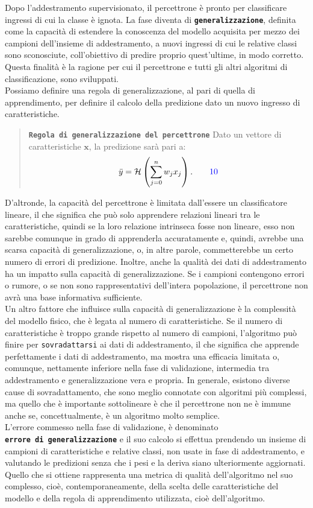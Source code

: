 \documentclass[
  letterpaper,
  DIV=11,
  numbers=noendperiod]{scrreprt}
\begin{document}
Dopo l'addestramento supervisionato, il percettrone è pronto per
classificare ingressi di cui la classe è ignota. La fase diventa di
\textbf{\texttt{generalizzazione}}, definita come la capacità di
estendere la conoscenza del modello acquisita per mezzo dei campioni
dell'insieme di addestramento, a nuovi ingressi di cui le relative
classi sono sconosciute, coll'obiettivo di predire proprio quest'ultime,
in modo corretto. Questa finalità è la ragione per cui il percettrone e
tutti gli altri algoritmi di classificazione, sono sviluppati.\\
Possiamo definire una regola di generalizzazione, al pari di quella di
apprendimento, per definire il calcolo della predizione dato un nuovo
ingresso di caratteristiche.

\begin{quote}
\textbf{\texttt{Regola\ di\ generalizzazione\ del\ percettrone}} Dato un
vettore di caratteristiche \(\mathbf{x}\), la predizione sarà pari a: \[
\bar{y}=\mathcal{H}\left(\sum_{j=0}^{n}w_j x_j\right).\tag*{\color{blue}{10}}
\]
\end{quote}

D'altronde, la capacità del percettrone è limitata dall'essere un
classificatore lineare, il che significa che può solo apprendere
relazioni lineari tra le caratteristiche, quindi se la loro relazione
intrinseca fosse non lineare, esso non sarebbe comunque in grado di
apprenderla accuratamente e, quindi, avrebbe una scarsa capacità di
generalizzazione, o, in altre parole, commetterebbe un certo numero di
errori di predizione. Inoltre, anche la qualità dei dati di
addestramento ha un impatto sulla capacità di generalizzazione. Se i
campioni contengono errori o rumore, o se non sono rappresentativi
dell'intera popolazione, il percettrone non avrà una base informativa
sufficiente.\\
Un altro fattore che influisce sulla capacità di generalizzazione è la
complessità del modello fisico, che è legata al numero di
caratteristiche. Se il numero di caratteristiche è troppo grande
rispetto al numero di campioni, l'algoritmo può finire per
\texttt{sovradattarsi} ai dati di addestramento, il che significa che
apprende perfettamente i dati di addestramento, ma mostra una efficacia
limitata o, comunque, nettamente inferiore nella fase di validazione,
intermedia tra addestramento e generalizzazione vera e propria. In
generale, esistono diverse cause di sovradattamento, che sono meglio
connotate con algoritmi più complessi, ma quello che è importante
sottolineare è che il percettrone non ne è immune anche se,
concettualmente, è un algoritmo molto semplice.\\
L'errore commesso nella fase di validazione, è denominato
\textbf{\texttt{errore\ di\ generalizzazione}} e il suo calcolo si
effettua prendendo un insieme di campioni di caratteristiche e relative
classi, non usate in fase di addestramento, e valutando le predizioni
senza che i pesi e la deriva siano ulteriormente aggiornati. Quello che
si ottiene rappresenta una metrica di qualità dell'algoritmo nel suo
complesso, cioè, contemporaneamente, della scelta delle caratteristiche
del modello e della regola di apprendimento utilizzata, cioè
dell'algoritmo.
\end{document}
